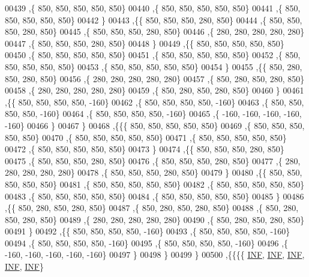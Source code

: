 \begin{DoxyCode}
00439    ,\{   850,   850,   850,   850,   850\}
00440    ,\{   850,   850,   850,   850,   850\}
00441    ,\{   850,   850,   850,   850,   850\}
00442    \}
00443   ,\{\{   850,   850,   850,   280,   850\}
00444    ,\{   850,   850,   850,   280,   850\}
00445    ,\{   850,   850,   850,   280,   850\}
00446    ,\{   280,   280,   280,   280,   280\}
00447    ,\{   850,   850,   850,   280,   850\}
00448    \}
00449   ,\{\{   850,   850,   850,   850,   850\}
00450    ,\{   850,   850,   850,   850,   850\}
00451    ,\{   850,   850,   850,   850,   850\}
00452    ,\{   850,   850,   850,   850,   850\}
00453    ,\{   850,   850,   850,   850,   850\}
00454    \}
00455   ,\{\{   850,   280,   850,   280,   850\}
00456    ,\{   280,   280,   280,   280,   280\}
00457    ,\{   850,   280,   850,   280,   850\}
00458    ,\{   280,   280,   280,   280,   280\}
00459    ,\{   850,   280,   850,   280,   850\}
00460    \}
00461   ,\{\{   850,   850,   850,   850,  -160\}
00462    ,\{   850,   850,   850,   850,  -160\}
00463    ,\{   850,   850,   850,   850,  -160\}
00464    ,\{   850,   850,   850,   850,  -160\}
00465    ,\{  -160,  -160,  -160,  -160,  -160\}
00466    \}
00467   \}
00468  ,\{\{\{   850,   850,   850,   850,   850\}
00469    ,\{   850,   850,   850,   850,   850\}
00470    ,\{   850,   850,   850,   850,   850\}
00471    ,\{   850,   850,   850,   850,   850\}
00472    ,\{   850,   850,   850,   850,   850\}
00473    \}
00474   ,\{\{   850,   850,   850,   280,   850\}
00475    ,\{   850,   850,   850,   280,   850\}
00476    ,\{   850,   850,   850,   280,   850\}
00477    ,\{   280,   280,   280,   280,   280\}
00478    ,\{   850,   850,   850,   280,   850\}
00479    \}
00480   ,\{\{   850,   850,   850,   850,   850\}
00481    ,\{   850,   850,   850,   850,   850\}
00482    ,\{   850,   850,   850,   850,   850\}
00483    ,\{   850,   850,   850,   850,   850\}
00484    ,\{   850,   850,   850,   850,   850\}
00485    \}
00486   ,\{\{   850,   280,   850,   280,   850\}
00487    ,\{   850,   280,   850,   280,   850\}
00488    ,\{   850,   280,   850,   280,   850\}
00489    ,\{   280,   280,   280,   280,   280\}
00490    ,\{   850,   280,   850,   280,   850\}
00491    \}
00492   ,\{\{   850,   850,   850,   850,  -160\}
00493    ,\{   850,   850,   850,   850,  -160\}
00494    ,\{   850,   850,   850,   850,  -160\}
00495    ,\{   850,   850,   850,   850,  -160\}
00496    ,\{  -160,  -160,  -160,  -160,  -160\}
00497    \}
00498   \}
00499  \}
00500 ,\{\{\{\{   \mbox{\hyperlink{energy__const_8h_a12c2040f25d8e3a7b9e1c2024c618cb6}{INF}},   \mbox{\hyperlink{energy__const_8h_a12c2040f25d8e3a7b9e1c2024c618cb6}{INF}},   \mbox{\hyperlink{energy__const_8h_a12c2040f25d8e3a7b9e1c2024c618cb6}{INF}},   \mbox{\hyperlink{energy__const_8h_a12c2040f25d8e3a7b9e1c2024c618cb6}{INF}},   \mbox{\hyperlink{energy__const_8h_a12c2040f25d8e3a7b9e1c2024c618cb6}{INF}}\}

\end{DoxyCode}
